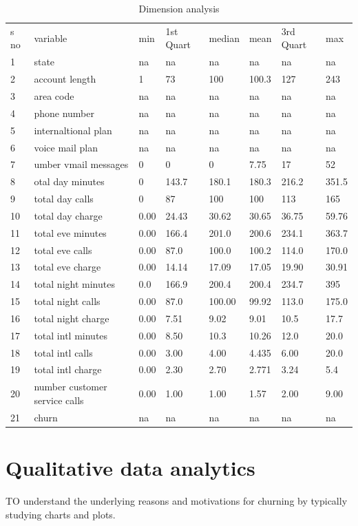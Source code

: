 \begin{table}[H]
	\centering
	\caption{Dimension analysis}
	\label{summary-dim}
	\begin{tabular}{llllllll}
		s no & variable & min & 1st Quart & median & mean & 3rd Quart & max \\
1&state&na&na&na&na&na&na\\
2&account length&1&73&100&100.3&127&243\\
3&area code&na&na&na&na&na&na\\
4&phone number&na&na&na&na&na&na\\
5&internaltional plan&na&na&na&na&na&na\\
6&voice mail plan&na&na&na&na&na&na\\
7&umber vmail messages&0&0&0&7.75&17&52\\
8&otal day minutes&0&143.7&180.1&180.3&216.2&351.5\\
9&total day calls&0&87&100&100&113&165\\
10&total day charge&0.00&24.43&30.62&30.65&36.75&59.76\\
11&total eve minutes&0.00&166.4&201.0&200.6&234.1&363.7\\
12&total eve calls&0.00&87.0&100.0&100.2&114.0&170.0\\
13&total eve charge&0.00&14.14&17.09&17.05&19.90&30.91\\
14&total night minutes&0.0&166.9&200.4&200.4&234.7&395\\
15&total night calls&0.00&87.0&100.00&99.92&113.0&175.0\\
16&total night charge&0.00&7.51&9.02&9.01&10.5&17.7\\
17&total intl minutes&0.00&8.50&10.3&10.26&12.0&20.0\\
18&total intl calls&0.00&3.00&4.00&4.435&6.00&20.0\\
19&total intl charge&0.00&2.30&2.70&2.771&3.24&5.4\\
20&number customer service calls&  0.00   &  1.00   &  1.00 & 1.57 & 2.00 & 9.00     \\
		21& churn         & na    & na          & na       &na      & na          & na   \\
		\end{tabular}
		\end{table}


\section{Qualitative data analytics}
TO understand the underlying reasons and motivations for churning by typically studying charts and plots.



